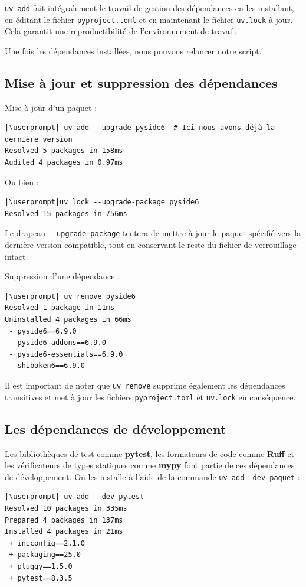 \texttt{uv add} fait intégralement le travail de gestion des dépendances en les installant, en éditant le fichier \texttt{pyproject.toml} et en maintenant le fichier \texttt{uv.lock} à jour. Cela garantit une reproductibilité de l'environnement de travail.

Une fois les dépendances installées, nous pouvons relancer notre script.

\subsection*{Mise à jour et suppression des dépendances}
Mise à jour d'un paquet :
\begin{lstlisting}[style=bash]
|\userprompt| uv add --upgrade pyside6  # Ici nous avons déjà la dernière version
Resolved 5 packages in 158ms
Audited 4 packages in 0.97ms
\end{lstlisting}

Ou bien :
\begin{lstlisting}[style=bash]
|\userprompt|uv lock --upgrade-package pyside6
Resolved 15 packages in 756ms
\end{lstlisting}

Le drapeau \texttt{-{}-upgrade-package} tentera de mettre à jour le paquet spécifié vers la dernière version compatible, tout en conservant le reste du fichier de verrouillage intact.

Suppression d'une dépendance :
\begin{lstlisting}[style=bash]
|\userprompt| uv remove pyside6
Resolved 1 package in 11ms
Uninstalled 4 packages in 66ms
 - pyside6==6.9.0
 - pyside6-addons==6.9.0
 - pyside6-essentials==6.9.0
 - shiboken6==6.9.0
\end{lstlisting}

Il est important de noter que \texttt{uv remove} supprime également les dépendances transitives et met à jour les fichiers \texttt{pyproject.toml} et \texttt{uv.lock} en conséquence.

\subsection*{Les dépendances de développement}
Les bibliothèques de test comme \textbf{pytest}, les formateurs de code comme \textbf{Ruff} et les vérificateurs de types statiques comme \textbf{mypy} font partie de ces dépendances de développement. On les installe à l'aide de la commande \texttt{uv add --dev paquet} :
\begin{lstlisting}[style=bash]
|\userprompt| uv add --dev pytest
Resolved 10 packages in 335ms
Prepared 4 packages in 137ms
Installed 4 packages in 21ms
 + iniconfig==2.1.0
 + packaging==25.0
 + pluggy==1.5.0
 + pytest==8.3.5
\end{lstlisting}

